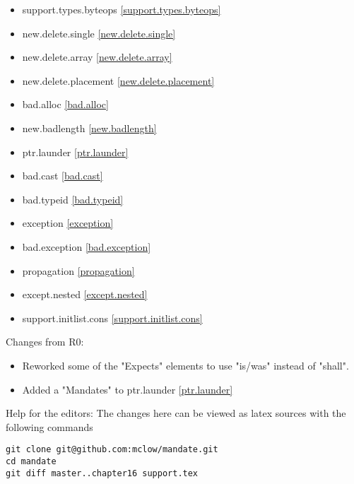 \begin{multicols}{2}
\begin{itemize}
\item{support.types.byteops  \ref{support.types.byteops}}
\item{new.delete.single      \ref{new.delete.single}}
\item{new.delete.array       \ref{new.delete.array}}
\item{new.delete.placement   \ref{new.delete.placement}}
\item{bad.alloc              \ref{bad.alloc}}
\item{new.badlength          \ref{new.badlength}}
\item{ptr.launder            \ref{ptr.launder}}
\item{bad.cast               \ref{bad.cast}}
\item{bad.typeid             \ref{bad.typeid}}
\item{exception              \ref{exception}}
\item{bad.exception          \ref{bad.exception}}
\item{propagation            \ref{propagation}}
\item{except.nested          \ref{except.nested}}
\item{support.initlist.cons  \ref{support.initlist.cons}}
\end{itemize}
\end{multicols}

Changes from R0:
\begin{itemize}
\item{Reworked some of the "Expects" elements to use "is/was" instead of "shall".}
\item{Added a "Mandates" to ptr.launder \ref{ptr.launder}}
\end{itemize}

\vfill
Help for the editors: The changes here can be viewed as latex sources with the following commands
\begin{verbatim}
git clone git@github.com:mclow/mandate.git
cd mandate
git diff master..chapter16 support.tex
\end{verbatim}
\newpage
